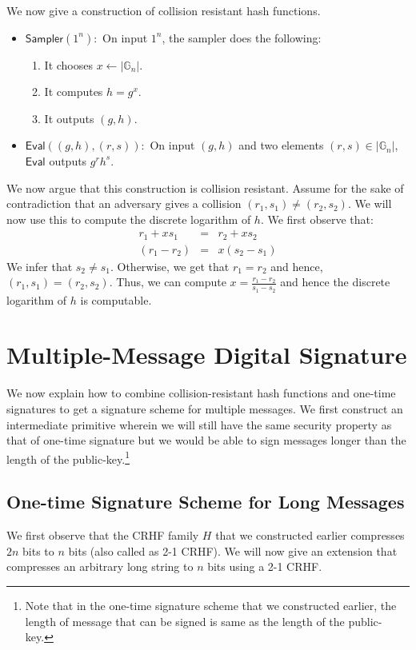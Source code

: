 \documentclass[12pt]{tufte-book}
\newcommand{\Sampler}{\mathsf{Sampler}}
\newcommand{\Eval}{\mathsf{Eval}}
\begin{document}
We now give a construction of collision resistant hash functions.  

\begin{itemize}
\item $\Sampler(1^n):$ On input $1^n$, the sampler does the following:
\begin{enumerate}
    \item It chooses $x \gets |\mathbb{G}_n|$.
    \item It computes $h = g^x$.
    \item It outputs $(g,h)$.

\end{enumerate}
\item $\Eval((g,h),(r,s)):$ On input $(g,h)$ and two elements $(r,s) \in |\mathbb{G}_n|$, $\Eval$ outputs $g^rh^s$.
\end{itemize}

We now argue that this construction is collision resistant. Assume for the sake of contradiction that an adversary gives a collision $(r_1,s_1) \neq (r_2,s_2)$. We will now use this to compute the discrete logarithm of $h$. We first observe that:
\begin{eqnarray*}
r_1+xs_1 &=& r_2 + xs_2\\
(r_1 - r_2) &=& x(s_2 - s_1)
\end{eqnarray*}
We infer that $s_2 \neq s_1$. Otherwise, we get that $r_1 = r_2$ and hence, $(r_1,s_1) = (r_2,s_2)$. Thus, we can compute $x = \frac{r_1-r_2}{s_1 - s_2}$ and hence the discrete logarithm of $h$ is computable.


\section{Multiple-Message Digital Signature}

We now explain how to combine collision-resistant hash functions and one-time signatures to get a signature scheme for multiple messages. We first construct an intermediate primitive wherein we will still have the same security property as that of one-time signature but we would be able to sign messages longer than the length of the public-key.\footnote{Note that in the one-time signature scheme that we constructed earlier, the length of message that can be signed is same as the length of the public-key.}


\subsection{One-time Signature Scheme for Long Messages}
We first observe that the CRHF family $H$ that we constructed earlier compresses $2n$ bits to $n$ bits (also called as 2-1 CRHF). We will now give an extension that compresses an arbitrary long string to $n$ bits using a 2-1 CRHF.
\end{document}
